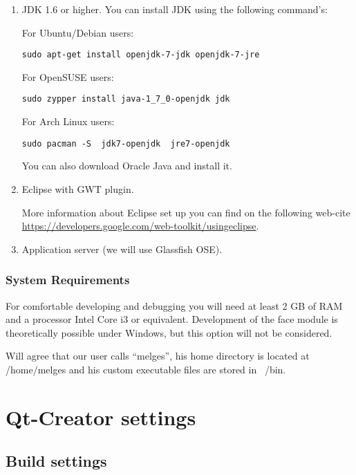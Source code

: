 \begin{enumerate}

\item JDK 1.6 or higher.
You can install JDK using the following command's:

For Ubuntu/Debian users:

\begin{lstlisting}
sudo apt-get install openjdk-7-jdk openjdk-7-jre
\end{lstlisting}

For OpenSUSE users:

\begin{lstlisting}
sudo zypper install java-1_7_0-openjdk jdk
\end{lstlisting}

For Arch Linux users:

\begin{lstlisting}
sudo pacman -S  jdk7-openjdk  jre7-openjdk
\end{lstlisting}

You can also download Oracle Java and install it.

\item Eclipse with GWT plugin.

More information about Eclipse set up you can find on the following web-cite \url{https://developers.google.com/web-toolkit/usingeclipse}.

\item Application server (we will use Glassfish OSE).

\end{enumerate}

\subsection{System Requirements}

For comfortable developing and debugging you will need at least 2 GB of RAM and a processor Intel Core i3 or equivalent. Development of the face module is theoretically possible under Windows, but this option will not be considered.

Will agree that our user calls ``melges'', his home directory is located at /home/melges and his custom executable files are stored in ~/bin.

\chapter{Qt-Creator settings}

\section{Build settings}\label{sec:qt-build}

